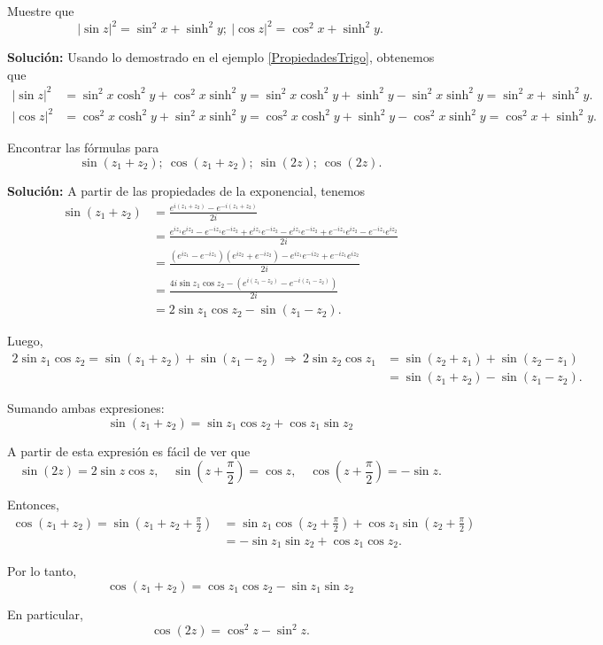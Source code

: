 \begin{ejemplo}
Muestre que 
$$|\sin z|^2 = \sin^2 x + \sinh^2 y; ~ |\cos z|^2 = \cos^2x + \sinh^2y.$$

\textbf{Solución:} Usando lo demostrado en el ejemplo \ref{PropiedadesTrigo}, obtenemos que 
\begin{align*}
|\sin z|^2 &= \sin^2 x \cosh^2 y + \cos^2x \sinh^2 y  = \sin^2 x \cosh^2 y + \sinh^2 y - \sin^2 x \sinh^2 y =  \sin^2x + \sinh^2 y. \\
|\cos z|^2 &= \cos^2 x \cosh^2 y + \sin^2 x \sinh^2 y = \cos^2 x \cosh^2 y + \sinh^2 y - \cos^2 x \sinh^2 y = \cos^2 x + \sinh^2 y.
\end{align*}
\end{ejemplo}

\begin{ejemplo}
Encontrar las fórmulas para 
$$\sin(z_1 + z_2); ~ \cos(z_1+z_2); ~ \sin(2z);~ \cos(2z).$$

\textbf{Solución:} A partir de las propiedades de la exponencial, tenemos 
\begin{align*}
\sin(z_1 + z_2) &= \frac{e^{i(z_1 + z_2)} - e^{-i(z_1 + z_2)}}{2i} \\
&= \frac{e^{iz_1}e^{iz_2} - e^{-iz_1}e^{-iz_2} + e^{iz_1}e^{-iz_2} - e^{iz_1}e^{-iz_2} + e^{-iz_1}e^{iz_2} - e^{-iz_1}e^{iz_2} }{2i}  \\
&= \frac{(e^{iz_1} - e^{-iz_1})(e^{iz_2} + e^{-iz_2}) -e^{iz_1}e^{-iz_2} + e^{-iz_1}e^{iz_2}}{2i} \\
&= \frac{4i \sin z_1 \cos z_2 - (e^{i(z_1 - z_2)} - e^{-i(z_1 - z_2)}) }{2i} \\
&= 2\sin z_1 \cos z_2 - \sin(z_1 - z_2).
\end{align*}

Luego, 
\begin{align*}
2 \sin z_1 \cos z_2 = \sin(z_1 + z_2) + \sin(z_1 - z_2) ~\Rightarrow~ 2 \sin z_2 \cos z_1 &= \sin(z_2 + z_1) + \sin(z_2 - z_1) \\
&= \sin(z_1 + z_2) - \sin(z_1 - z_2).
\end{align*}

Sumando ambas expresiones:
$$\boxed{\sin(z_1 + z_2) = \sin z_1 \cos z_2 +\cos z_1 \sin z_2}$$ 

A partir de esta expresión es fácil de ver que
\begin{equation*}
\sin(2z) = 2 \sin z \cos z, \quad
\sin\left(z + \frac{\pi}{2} \right) = \cos z, \quad 
\cos\left( z + \frac{\pi}{2} \right) = - \sin z.
\end{equation*}

Entonces, 
\begin{align*}
\cos(z_1 + z_2) = \sin\left(z_1 + z_2 + \frac{\pi}{2} \right) &= \sin z_1 \cos\left( z_2 + \frac{\pi}{2} \right) + \cos z_1 \sin\left(z_2 + \frac{\pi}{2} \right) \\
&=  - \sin z_1 \sin z_2 + \cos z_1 \cos z_2.
\end{align*}

Por lo tanto,
$$\boxed{\cos(z_1 + z_2) =  \cos z_1 \cos z_2 - \sin z_1 \sin z_2}$$

En particular,
$$\cos(2z) = \cos^2 z - \sin^2 z.$$
\end{ejemplo}

